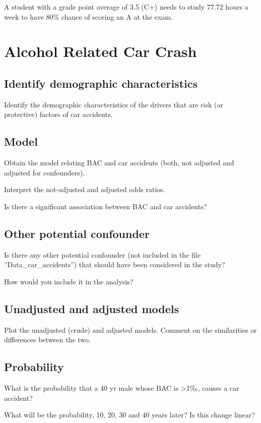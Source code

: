A student with a grade point average of 3.5 (C+) needs to study 77.72 hours a week to have 80\% chance of scoring an A at the exam.


\section{Alcohol Related Car Crash}

\subsection{Identify demographic characteristics}
Identify the demographic characteristics of the drivers that are risk (or protective) factors of car accidents.

\subsection{Model}

Obtain the model relating BAC and car accidents (both, not adjusted and adjusted for confounders). 

Interpret the not‐adjusted and adjusted odds ratios. 

Is there a significant association between BAC and car accidents?

\subsection{Other potential confounder}
Is there any other potential confounder (not included in the file ”Data{_}car{_}accidents”) that should have
been considered in the study? 

How would you include it in the analysis?

\subsection{Unadjusted and adjusted models}

Plot the unadjusted (crude) and adjusted models. 
Comment on the similarities or differences between the
two.

\subsection{Probability}

What is the probability that a 40 yr male whose BAC is >1‰, causes a car accident? 

What will be the probability, 10, 20, 30 and 40 years later? Is this change linear?

